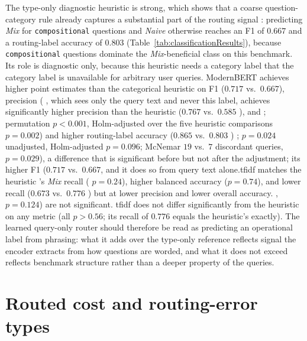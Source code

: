 \documentclass[english, bibtex]{kththesis}               %
\numberwithin{listing}{chapter}
\providecommand{\DIFaddtex}[1]{{\protect\color{blue} \sf #1}} %
\providecommand{\DIFdeltex}[1]{{\protect\color{red} \scriptsize #1}} %
\providecommand{\DIFaddbegin}{} %
\providecommand{\DIFaddend}{} %
\providecommand{\DIFdelbegin}{} %
\providecommand{\DIFdelend}{} %
\providecommand{\DIFadd}[1]{\texorpdfstring{\DIFaddtex{#1}}{#1}} %
\providecommand{\DIFdel}[1]{\texorpdfstring{\DIFdeltex{#1}}{}} %
\begin{document}
The type-only diagnostic heuristic is strong, which shows that a coarse question-category rule already captures a substantial part of the routing signal\DIFaddbegin \DIFadd{: predicting \emph{Mix} for \texttt{compositional} questions and \emph{Naive} otherwise reaches an F1 of $0.667$ and a routing-label accuracy of $0.803$ (Table~\ref{tab:classificationResults}), because \texttt{compositional} questions dominate the \emph{Mix}-beneficial class on this benchmark}\DIFaddend . Its role is diagnostic only, because \DIFdelbegin \DIFdel{this heuristic needs a category label that }\DIFdelend \DIFaddbegin \DIFadd{the category label }\DIFaddend is unavailable for arbitrary user queries. ModernBERT\DIFdelbegin \DIFdel{achieves higher point estimates than the categorical heuristic on F1 ($0.717$ vs.\ $0.667$), precision (}\DIFdelend \DIFaddbegin \DIFadd{, which sees only the query text and never this label, achieves significantly higher precision than the heuristic (}\DIFaddend $0.767$ vs.\ $0.585$\DIFdelbegin \DIFdel{), and }\DIFdelend \DIFaddbegin \DIFadd{; permutation $p < 0.001$, Holm-adjusted over the five heuristic comparisons $p = 0.002$) and higher }\DIFaddend routing-label accuracy ($0.865$ vs.\ $0.803$\DIFdelbegin \DIFdel{)}\DIFdelend \DIFaddbegin \DIFadd{; $p = 0.024$ unadjusted, Holm-adjusted $p = 0.096$; McNemar $19$ vs.\ $7$ discordant queries, $p = 0.029$), a difference that is significant before but not after the adjustment; its higher F1 ($0.717$ vs.\ $0.667$}\DIFaddend , \DIFdelbegin \DIFdel{and it does so from query text alone.\gls{tfidf} matches the heuristic 's \emph{Mix} recall (}\DIFdelend \DIFaddbegin \DIFadd{$p = 0.24$), higher balanced accuracy ($p = 0.74$), and lower recall ($0.673$ vs.\ }\DIFaddend $0.776$\DIFdelbegin \DIFdel{) but at lower precision and lower overall accuracy.
}\DIFdelend \DIFaddbegin \DIFadd{, $p = 0.124$) are not significant. \gls{tfidf} does not differ significantly from the heuristic on any metric (all $p > 0.56$; its recall of $0.776$ equals the heuristic's exactly). The learned query-only router should therefore be read as predicting an operational label from phrasing: what it adds over the type-only reference reflects signal the encoder extracts from how questions are worded, and what it does not exceed reflects benchmark structure rather than a deeper property of the queries.
}

\section{Routed cost and routing-error types}
\label{sec:resultsCost}
\end{document}
